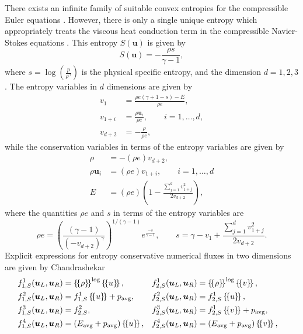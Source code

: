 \documentclass[review,onefignum,onetabnum,final]{siamart171218}
\newcommand{\LRp}[1]{\left( #1 \right)}
\newcommand{\LRc}[1]{\left\{ #1 \right\}}
\newcommand{\avg}[1] {\ensuremath{\LRc{\!\{#1\}\!}}}
\begin{document}
There exists an infinite family of suitable convex entropies for the compressible Euler equations \cite{harten1983symmetric}.  However, there is only a single unique entropy which appropriately treats the viscous heat conduction term in the compressible Navier-Stokes equations \cite{hughes1986new}.  This entropy $S(\bm{u})$ is given by
\begin{equation*}
S(\bm{u}) = -\frac{\rho s}{\gamma-1}, 
\end{equation*}
where $s = \log\LRp{\frac{p}{\rho^\gamma}}$ is the physical specific entropy, and the dimension $d = 1,2,3$.  The entropy variables in $d$ dimensions are given by
\begin{align*}
v_1 &= \frac{\rho e (\gamma + 1 - s) - E}{\rho e}, \\
v_{1+ i}&= \frac{\rho \bm{u}_i}{\rho e}, \qquad i = 1,\ldots, d,\\
v_{d+2} &= -\frac{\rho}{\rho e},
\end{align*}
while the conservation variables in terms of the entropy variables are given by
\begin{align*}
\rho &= -(\rho e) v_{d+2}, \\
 \rho \bm{u}_i &= (\rho e) v_{1+i}, \qquad i = 1,\ldots,d\\
 E &= (\rho e)\LRp{1 - \frac{\sum_{j=1}^d{v_{1+j}^2}}{2 v_{d+2}}},
\end{align*}
where the quantities $\rho e$ and $s$ in terms of the entropy variables are 
\begin{equation*}
\rho e = \LRp{\frac{(\gamma-1)}{\LRp{-v_{d+2}}^{\gamma}}}^{1/(\gamma-1)}e^{\frac{-s}{\gamma-1}}, \qquad s = \gamma - v_1 + \frac{\sum_{j=1}^d{v_{1+j}^2}}{2v_{d+2}}.
\end{equation*}
Explicit expressions for entropy conservative numerical fluxes in two dimensions  are given by Chandrashekar \cite{chandrashekar2013kinetic}
\begin{align*}
&f^1_{1,S}(\bm{u}_L,\bm{u}_R) = \avg{\rho}^{\log} \avg{u},& &f^1_{2,S}(\bm{u}_L,\bm{u}_R) = \avg{\rho}^{\log} \avg{v},&\\
&f^2_{1,S}(\bm{u}_L,\bm{u}_R) = f^1_{1,S} \avg{u} + p_{\rm avg},&  &f^2_{2,S}(\bm{u}_L,\bm{u}_R) = f^1_{2,S} \avg{u},&\nonumber\\
&f^3_{1,S}(\bm{u}_L,\bm{u}_R) = f^2_{2,S},& &f^3_{2,S}(\bm{u}_L,\bm{u}_R) = f^1_{2,S} \avg{v} + p_{\rm avg},&\nonumber\\
&f^4_{1,S}(\bm{u}_L,\bm{u}_R) = \LRp{E_{\rm avg} + p_{\rm avg}}\avg{u},& &f^4_{2,S}(\bm{u}_L,\bm{u}_R) = \LRp{E_{\rm avg} + p_{\rm avg} }\avg{v},& \nonumber
\end{align*}
\end{document}
